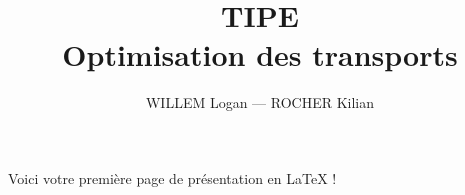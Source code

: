 \documentclass[14pt]{beamer}
\title{TIPE \\ Optimisation des transports}
\author{WILLEM Logan — ROCHER Kilian}
\date{}
\begin{document}
    \maketitle

	\begin{frame}
	Voici votre première page de présentation en LaTeX !
	\end{frame}

\pagebreak
\end{document}
